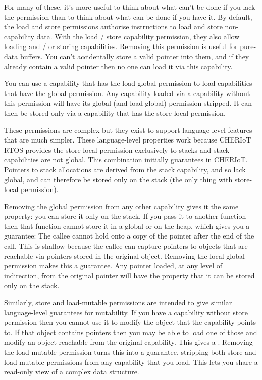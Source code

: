 For many of these, it's more useful to think about what can't be done if you lack the permission than to think about what can be done if you have it.
By default, the load and store permissions authorise instructions to load and store non-capability data.
With the load / store capability permission, they also allow loading and / or storing capabilities.
Removing this permission is useful for pure-data buffers.
You can't accidentally store a valid pointer into them, and if they already contain a valid pointer then no one can load it via this capability. 

You can use a capability that has the load-global permission to load capabilities that have the global permission.
Any capability loaded via a capability without this permission will have its global (and load-global) permission stripped.
It can then be stored only via a capability that has the store-local permission.

These permissions are complex but they exist to support language-level features that are much simpler.
These language-level properties work because CHERIoT RTOS provides the store-local permission exclusively to stacks and stack capabilities are not global.
This combination initially guarantees  in CHERIoT.
Pointers to stack allocations are derived from the stack capability, and so lack global, and can therefore be stored only on the stack (the only thing with store-local permission).

Removing the global permission from any other capability gives it the same property: you can store it only on the stack.
If you pass it to another function then that function cannot store it in a global or on the heap, which gives you a  guarantee:
The callee cannot hold onto a copy of the pointer after the end of the call.
This is shallow because the callee can capture pointers to objects that are reachable via pointers stored in the original object.
Removing the local-global permission makes this a  guarantee.
Any pointer loaded, at any level of indirection, from the original pointer will have the property that it can be stored only on the stack.

Similarly, store and load-mutable permissions are intended to give similar language-level guarantees for mutability.
If you have a capability without store permission then you cannot use it to modify the object that the capability points to.
If that object contains pointers then you may be able to load one of those and modify an object reachable from the original capability.
This gives a .
Removing the load-mutable permission turns this into a  guarantee, stripping both store and load-mutable permissions from any capability that you load.
This lets you share a read-only view of a complex data structure.

